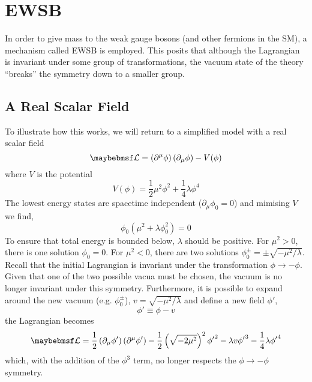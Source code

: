 \section{\acl{EWSB}}
\label{sec:theory_ewsb}
In order to give mass to the weak gauge bosons (and other fermions in the
\ac{SM}), a mechanism called \acl{EWSB} is employed. This posits that although
the Lagrangian is invariant under some group of transformations, the vacuum
state of the theory ``breaks'' the symmetry down to a smaller group.

\subsection{A Real Scalar Field}
To illustrate how this works, we will return to a simplified model with a real
scalar field
\begin{equation}
\lagrangiand = \left(\partial^{\mu}\phi\right)\left(\partial_{\mu}\phi\right)
-V(\phi)
\end{equation}
where $V$ is the potential
\begin{equation}
V(\phi) = \frac{1}{2}\mu^2\phi^2 + \frac{1}{4}\lambda\phi^4
\end{equation}
The lowest energy states are spacetime independent ($\partial_{\mu} \phi_0 = 0$)
and mimising $V$ we find,
\begin{equation}
\phi_0 \left (\mu^2 + \lambda\phi_0^2\right) = 0
\end{equation}
To ensure that total energy is bounded below, $\lambda$ should be positive. For
$\mu^2 > 0$, there is one solution $\phi_0 = 0$. For $\mu^2 < 0$, there are two
solutions $\phi^\pm_0 = \pm \sqrt{-\mu^2/\lambda}$. Recall that the initial
Lagrangian is invariant under the transformation $\phi \longrightarrow
-\phi$. Given that one of the two possible vacua must be chosen, the vacuum is
no longer invariant under this symmetry. Furthermore, it is possible to expand
around the new vacuum (e.g. $\phi_0^\pm$), $v=\sqrt{-\mu^2/\lambda}$ and define
a new field $\phi'$,
\begin{equation}
\phi' \equiv \phi - v
\end{equation}
the Lagrangian becomes
\begin{equation}
\lagrangiand = \frac{1}{2}
\left(\partial_{\mu}\phi'\right)\left(\partial^{\mu}\phi'\right)
-\frac{1}{2}\left(\sqrt{-2\mu^2}\right)^2{\phi'}^2 - \lambda v {\phi'}^3
-\frac{1}{4}\lambda{\phi'}^4
\end{equation}
which, with the addition of the $\phi^3$ term, no longer respects the $\phi
\longrightarrow -\phi$ symmetry.

